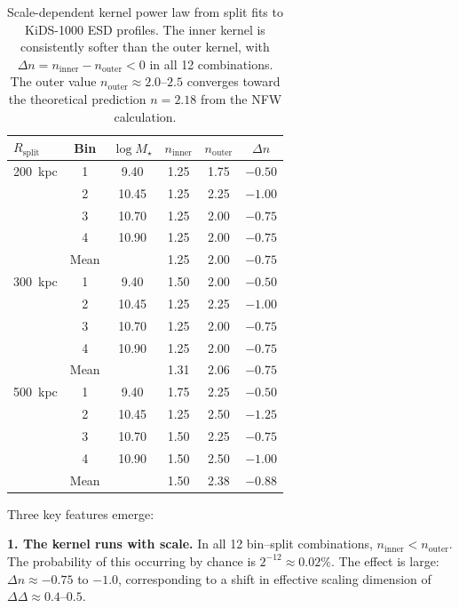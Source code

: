 \documentclass[12pt,a4paper]{article}
\begin{document}
\begin{table}[ht]
\centering
\begin{tabular}{lccccc}
\hline\hline
$R_{\mathrm{split}}$ & Bin & $\log M_\star$ & $n_{\mathrm{inner}}$ & $n_{\mathrm{outer}}$ & $\Delta n$ \\
\hline
200~kpc & 1 & 9.40  & 1.25 & 1.75 & $-0.50$ \\
        & 2 & 10.45 & 1.25 & 2.25 & $-1.00$ \\
        & 3 & 10.70 & 1.25 & 2.00 & $-0.75$ \\
        & 4 & 10.90 & 1.25 & 2.00 & $-0.75$ \\
        & Mean & & 1.25 & 2.00 & $-0.75$ \\
\hline
300~kpc & 1 & 9.40  & 1.50 & 2.00 & $-0.50$ \\
        & 2 & 10.45 & 1.25 & 2.25 & $-1.00$ \\
        & 3 & 10.70 & 1.25 & 2.00 & $-0.75$ \\
        & 4 & 10.90 & 1.25 & 2.00 & $-0.75$ \\
        & Mean & & 1.31 & 2.06 & $-0.75$ \\
\hline
500~kpc & 1 & 9.40  & 1.75 & 2.25 & $-0.50$ \\
        & 2 & 10.45 & 1.25 & 2.50 & $-1.25$ \\
        & 3 & 10.70 & 1.50 & 2.25 & $-0.75$ \\
        & 4 & 10.90 & 1.50 & 2.50 & $-1.00$ \\
        & Mean & & 1.50 & 2.38 & $-0.88$ \\
\hline\hline
\end{tabular}
\caption{Scale-dependent kernel power law from split fits to KiDS-1000 ESD profiles. The inner kernel is consistently softer than the outer kernel, with $\Delta n = n_{\mathrm{inner}} - n_{\mathrm{outer}} < 0$ in all 12 combinations. The outer value $n_{\mathrm{outer}} \approx 2.0$--$2.5$ converges toward the theoretical prediction $n = 2.18$ from the NFW calculation.}
\label{tab:running}
\end{table}

Three key features emerge:

\textbf{1. The kernel runs with scale.} In all 12 bin--split combinations, $n_{\mathrm{inner}} < n_{\mathrm{outer}}$. The probability of this occurring by chance is $2^{-12} \approx 0.02\%$. The effect is large: $\Delta n \approx -0.75$ to $-1.0$, corresponding to a shift in effective scaling dimension of $\Delta\Delta \approx 0.4$--$0.5$.
\end{document}
